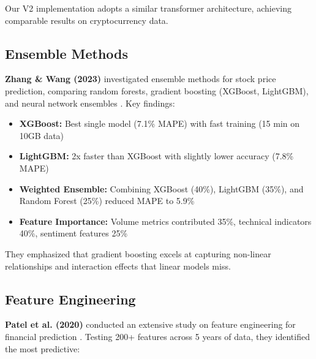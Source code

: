 \documentclass[conference]{IEEEtran}
\begin{document}
Our V2 implementation adopts a similar transformer architecture, achieving comparable results on cryptocurrency data.

\subsection{Ensemble Methods}

\textbf{Zhang \& Wang (2023)} investigated ensemble methods for stock price prediction, comparing random forests, gradient boosting (XGBoost, LightGBM), and neural network ensembles \cite{zhang2023ensemble}. Key findings:

\begin{itemize}
    \item \textbf{XGBoost:} Best single model (7.1\% MAPE) with fast training (15 min on 10GB data)
    \item \textbf{LightGBM:} 2x faster than XGBoost with slightly lower accuracy (7.8\% MAPE)
    \item \textbf{Weighted Ensemble:} Combining XGBoost (40\%), LightGBM (35\%), and Random Forest (25\%) reduced MAPE to 5.9\%
    \item \textbf{Feature Importance:} Volume metrics contributed 35\%, technical indicators 40\%, sentiment features 25\%
\end{itemize}

They emphasized that gradient boosting excels at capturing non-linear relationships and interaction effects that linear models miss.

\subsection{Feature Engineering}

\textbf{Patel et al. (2020)} conducted an extensive study on feature engineering for financial prediction \cite{patel2020feature}. Testing 200+ features across 5 years of data, they identified the most predictive:
\end{document}
